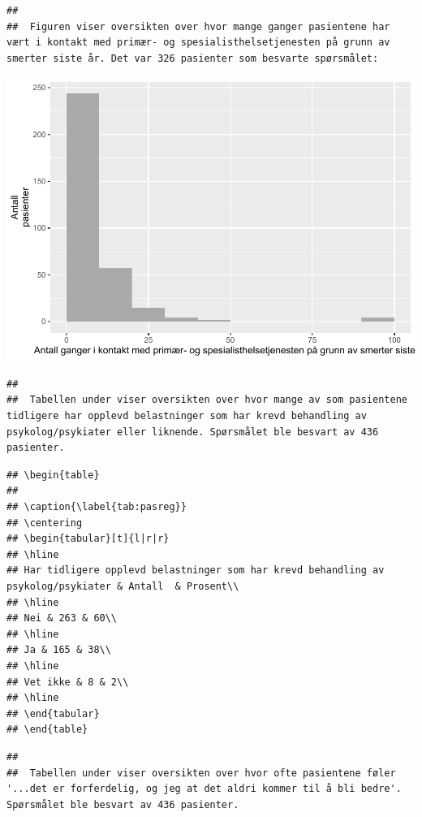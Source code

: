 \documentclass[
]{article}
\begin{document}
\begin{verbatim}
## 
##  Figuren viser oversikten over hvor mange ganger pasientene har vært i kontakt med primær- og spesialisthelsetjenesten på grunn av smerter siste år. Det var 326 pasienter som besvarte spørsmålet:
\end{verbatim}

\includegraphics{LokalEprom_files/figure-latex/rest-1.pdf}

\begin{verbatim}
## 
##  Tabellen under viser oversikten over hvor mange av som pasientene tidligere har opplevd belastninger som har krevd behandling av psykolog/psykiater eller liknende. Spørsmålet ble besvart av 436 pasienter.
\end{verbatim}

\begin{verbatim}
## \begin{table}
## 
## \caption{\label{tab:pasreg}}
## \centering
## \begin{tabular}[t]{l|r|r}
## \hline
## Har tidligere opplevd belastninger som har krevd behandling av psykolog/psykiater & Antall  & Prosent\\
## \hline
## Nei & 263 & 60\\
## \hline
## Ja & 165 & 38\\
## \hline
## Vet ikke & 8 & 2\\
## \hline
## \end{tabular}
## \end{table}
\end{verbatim}

\begin{verbatim}
## 
##  Tabellen under viser oversikten over hvor ofte pasientene føler '...det er forferdelig, og jeg at det aldri kommer til å bli bedre'. Spørsmålet ble besvart av 436 pasienter.
\end{verbatim}
\end{document}
